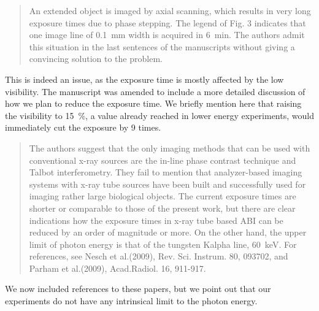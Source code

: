\documentclass[a4paper]{scrartcl}
\begin{document}
\begin{quote}
    An extended object is imaged by axial scanning, which results in very
    long exposure times due to phase stepping.  The legend of Fig. 3
    indicates that one image line of \SI{0.1}{\milli\metre} width is
    acquired in \SI{6}{\minute}.  The authors admit this situation in the last sentences of the manuscripts without giving a convincing solution to the problem.
\end{quote}
This is indeed an issue, as the exposure time is mostly affected by the low visibility. The manuscript
was amended to include a more detailed discussion of how we plan to reduce
the exposure time. We briefly mention here that raising the visibility to
\SI{15}{\percent}, a value already reached in lower energy experiments,
would immediately cut the exposure by \num{9} times.
\begin{quote}
    The authors suggest that the only imaging methods that can be used with
    conventional x-ray sources are the in-line phase contrast technique and
    Talbot interferometry. They fail to mention that analyzer-based imaging
    systems with x-ray tube sources have been built and successfully used
    for imaging rather large biological objects. The current exposure times
    are shorter or comparable to those of the present work, but there are
    clear indications how the exposure times in x-ray tube based ABI can be
    reduced by an order of magnitude or more. On the other hand, the upper
    limit of photon energy is that of the tungsten Kalpha line,
    \SI{60}{\kilo\eV}. For references, see Nesch et al.(2009), Rev. Sci. Instrum. 80, 093702, and Parham et al.(2009), Acad.Radiol. 16, 911-917.
\end{quote}
We now included references to these papers, but we point out that our
experiments do not have any intrinsical limit to the photon energy.
\end{document}
